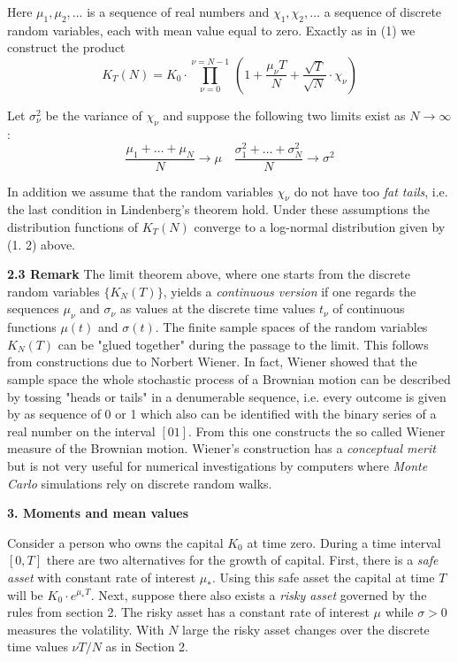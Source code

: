 \documentclass[12pt]{amsart}
\begin{document}
\noindent
Here $\mu_1,\mu_2,\ldots$ is a sequence of real numbers
and $\chi_1,\chi_2,\ldots$ a sequence of discrete random variables, each with
mean value equal to zero.
Exactly as in (1) we construct the product
\[
K_T(N)=K_0\cdot \prod_{\nu=0}^{\nu=N-1}\,
(1+\frac{\mu_\nu T}{N}+
\frac{\sqrt{ T}}{\sqrt{N}}\cdot\chi_\nu)
\]


\noindent
Let $\sigma_\nu^2$ be the variance of $\chi_\nu$ 
and suppose the following two limits
exist as $N\to\infty$:
\[
\frac{\mu_1+\ldots+\mu_N}{N}\to\mu\quad
\frac{\sigma^2_1+\ldots+\sigma^2_N}{N}\to\sigma^2
\]

\noindent
In addition we assume that the random variables $\chi_\nu$ do not have too
\emph{fat tails}, i.e. the last  condition in Lindenberg's theorem hold.
Under these assumptions
the distribution functions  of $K_T(N)$ converge to a log-normal distribution
given  by (1. 2)  above.

\bigskip

\noindent
{\bf 2.3 Remark} The limit theorem above, where one starts from
the discrete  random variables  $\{K_N(T)\}$, yields a \emph{continuous version}
if one regards
the sequences $\mu_\nu$ and $\sigma_\nu$ as values at the discrete 
time values $t_\nu$ of  continuous functions $\mu(t)$ and $\sigma(t)$.
The finite sample spaces of the random variables
$K_N(T)$ can be "glued together" during the passage to
the limit. This follows from    constructions 
due to  Norbert Wiener.
In fact, Wiener  showed that the sample space
the whole stochastic process of a
Brownian motion  can be
described by tossing "heads or tails" in a denumerable  sequence, i.e.
every outcome is given by as sequence of 0 or 1
which also can be identified with the binary series of a real number
on the interval $[01]$. From  this one constructs the so called
Wiener measure of
the Brownian motion. Wiener's  construction has  a  \emph{conceptual merit} 
but is not very useful
for numerical 
investigations by computers where \emph{Monte Carlo} simulations
rely  on discrete random walks.





\bigskip




\centerline{ \bf\large  3. Moments and mean values} 

\bigskip

\noindent
Consider 
a person who owns the capital $K_0$ at time zero.
During a time interval $[0,T]$ there are two
alternatives for the growth of capital. First, there is a 
{\it{safe asset}} with constant rate of interest $\mu_\ast$.
Using this safe asset the capital at time $T$
will be $K_0\cdot e^{\mu_\ast T}$.
Next, suppose there also exists  a {\it{risky asset}}
governed by the rules from section 2.
The risky asset has a
constant 
rate of interest $\mu$ while    $\sigma>0$ 
measures the volatility.
With $N$ large the risky asset changes
over the discrete time values $\nu T/N$ as in
Section 2. 
\medskip
\end{document}
